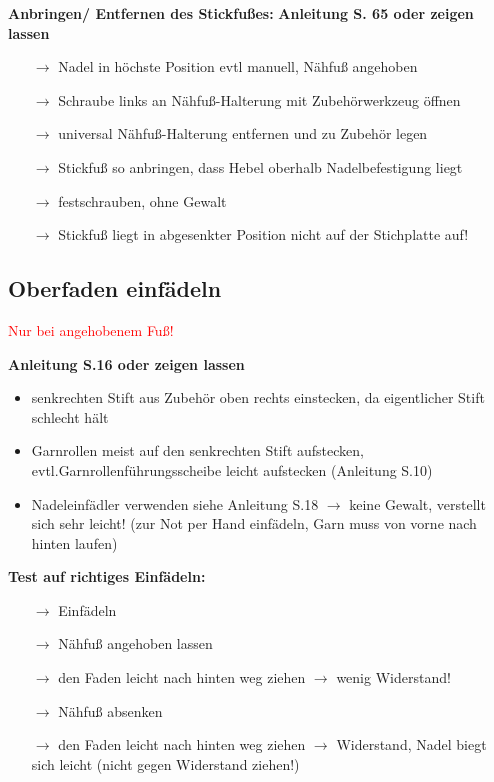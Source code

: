 \documentclass{\basedir/fablab-document}
\begin{document}
\vspace{2em}

\textbf{Anbringen/ Entfernen des Stickfußes:}
\newline
\textbf{Anleitung S. 65 oder zeigen lassen}
\begin{itemize}
 \item[$\rightarrow$] Nadel in höchste Position evtl manuell, Nähfuß angehoben
 \item[$\rightarrow$] Schraube links an Nähfuß-Halterung mit Zubehörwerkzeug öffnen
 \item[$\rightarrow$] universal Nähfuß-Halterung entfernen und zu Zubehör legen
 \item[$\rightarrow$] Stickfuß so anbringen, dass Hebel oberhalb Nadelbefestigung liegt
 \item[$\rightarrow$] festschrauben, ohne Gewalt
 \item[$\rightarrow$] Stickfuß liegt in abgesenkter Position nicht auf der Stichplatte auf!
\end{itemize}

\subsection{Oberfaden einfädeln}

\textcolor{red}{Nur bei angehobenem Fuß!}

\vspace{1em}

\textbf{Anleitung S.16 oder zeigen lassen}
\begin{itemize}
 \item senkrechten Stift aus Zubehör oben rechts einstecken, da eigentlicher Stift schlecht hält
 \item Garnrollen meist auf den senkrechten Stift aufstecken, evtl.Garnrollenführungsscheibe leicht aufstecken (Anleitung S.10)
 \item Nadeleinfädler verwenden siehe Anleitung S.18 $\rightarrow$ keine Gewalt, verstellt sich sehr leicht! (zur Not per Hand einfädeln, Garn muss von vorne nach hinten laufen)
\end{itemize}

\vspace{2em}

\textbf{Test auf richtiges Einfädeln:}
\begin{itemize}
 \item[$\rightarrow$] Einfädeln
 \item[$\rightarrow$] Nähfuß angehoben lassen
 \item[$\rightarrow$] den Faden leicht nach hinten weg ziehen $\rightarrow$ wenig Widerstand!
 \item[$\rightarrow$] Nähfuß absenken
 \item[$\rightarrow$] den Faden leicht nach hinten weg ziehen $\rightarrow$ Widerstand, Nadel biegt sich leicht (nicht gegen Widerstand ziehen!)
\end{itemize}
\end{document}
